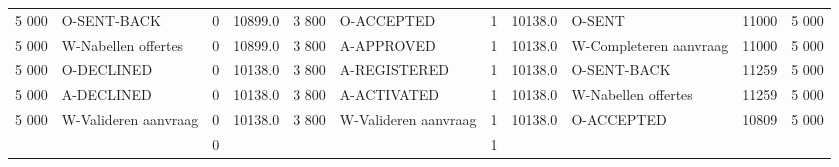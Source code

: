 \begin{tabular}{rlrlrlrllll}
5 000 & O-SENT-BACK & 0 & 10899.0 & 3 800 & O-ACCEPTED & 1 & 10138.0 & O-SENT & 11000 & 5 000 \\
5 000 & W-Nabellen offertes & 0 & 10899.0 & 3 800 & A-APPROVED & 1 & 10138.0 & W-Completeren aanvraag & 11000 & 5 000 \\
5 000 & O-DECLINED & 0 & 10138.0 & 3 800 & A-REGISTERED & 1 & 10138.0 & O-SENT-BACK & 11259 & 5 000 \\
5 000 & A-DECLINED & 0 & 10138.0 & 3 800 & A-ACTIVATED & 1 & 10138.0 & W-Nabellen offertes & 11259 & 5 000 \\
5 000 & W-Valideren aanvraag & 0 & 10138.0 & 3 800 & W-Valideren aanvraag & 1 & 10138.0 & O-ACCEPTED & 10809 & 5 000 \\
 &  & 0 &  &  &  & 1 &  &  &  &  \\
\bottomrule
\end{tabular}
